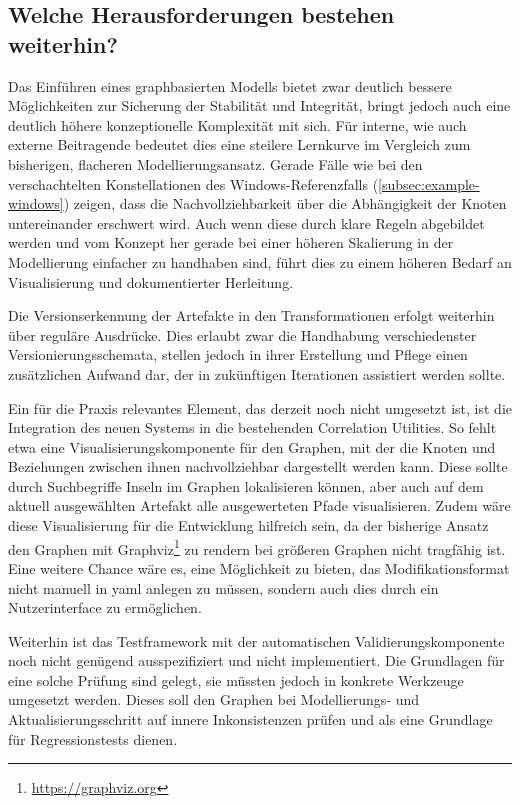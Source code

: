 \subsection{Welche Herausforderungen bestehen weiterhin?}\label{subsec:discussion-negative}

Das Einführen eines graphbasierten Modells bietet zwar deutlich bessere Möglichkeiten zur Sicherung der Stabilität und Integrität, bringt jedoch auch eine deutlich höhere konzeptionelle Komplexität mit sich.
Für interne, wie auch externe Beitragende bedeutet dies eine steilere Lernkurve im Vergleich zum bisherigen, flacheren Modellierungsansatz.
Gerade Fälle wie bei den verschachtelten Konstellationen des Windows-Referenzfalls (\autoref{subsec:example-windows}) zeigen, dass die Nachvollziehbarkeit über die Abhängigkeit der Knoten untereinander erschwert wird.
Auch wenn diese durch klare Regeln abgebildet werden und vom Konzept her gerade bei einer höheren Skalierung in der Modellierung einfacher zu handhaben sind, führt dies zu einem höheren Bedarf an Visualisierung und dokumentierter Herleitung.

Die Versionserkennung der Artefakte in den Transformationen erfolgt weiterhin über reguläre Ausdrücke.
Dies erlaubt zwar die Handhabung verschiedenster Versionierungsschemata, stellen jedoch in ihrer Erstellung und Pflege einen zusätzlichen Aufwand dar, der in zukünftigen Iterationen assistiert werden sollte.

Ein für die Praxis relevantes Element, das derzeit noch nicht umgesetzt ist, ist die Integration des neuen Systems in die bestehenden Correlation Utilities.
So fehlt etwa eine Visualisierungskomponente für den Graphen, mit der die Knoten und Beziehungen zwischen ihnen nachvollziehbar dargestellt werden kann.
Diese sollte durch Suchbegriffe Inseln im Graphen lokalisieren können, aber auch auf dem aktuell ausgewählten Artefakt alle ausgewerteten Pfade visualisieren.
Zudem wäre diese Visualisierung für die Entwicklung hilfreich sein, da der bisherige Ansatz den Graphen mit Graphviz\footnote{\url{https://graphviz.org}} zu rendern bei größeren Graphen nicht tragfähig ist.
Eine weitere Chance wäre es, eine Möglichkeit zu bieten, das Modifikationsformat nicht manuell in \acrshort{yaml} anlegen zu müssen, sondern auch dies durch ein Nutzerinterface zu ermöglichen.

Weiterhin ist das Testframework mit der automatischen Validierungskomponente noch nicht genügend ausspezifiziert und nicht implementiert.
Die Grundlagen für eine solche Prüfung sind gelegt, sie müssten jedoch in konkrete Werkzeuge umgesetzt werden.
Dieses soll den Graphen bei Modellierungs- und Aktualisierungsschritt auf innere Inkonsistenzen prüfen und als eine Grundlage für Regressionstests dienen.

